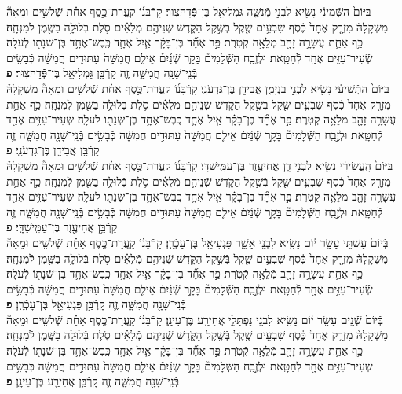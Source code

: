 \documentclass[twoside, openany, parskip=half, 11pt]{book}
\begin{document}
\begin{footnotesize}
\begin{multicols}{2}
בַּיּוֹם֙ הַשְּֿׁמִינִ֔י נָשִׂ֖יא לִבְנֵ֣י מְֿנַשֶּׁ֑ה גַּמְלִיאֵ֖ל בֶּן־פְּֿֿדָהצֽוּר׃ קָרְֿבָּנ֜וֹ קַֽעֲרַת־כֶּ֣סֶף אַחַ֗ת שְֿׁלֹשִׁ֣ים וּמֵאָה֘ מִשְׁקָלָהּ֒ מִזְרָ֤ק אֶחָד֙ כֶּ֔סֶף שִׁבְעִ֥ים שֶׁ֖קֶל בְּֿשֶׁ֣קֶל הַקֹּ֑דֶשׁ שְֿׁנֵיהֶ֣ם מְֿלֵאִ֗ים סֹ֛לֶת בְּֿלוּלָ֥ה בַשֶּׁ֖מֶן לְֿמִנְחָֽה׃ כַּ֥ף אַחַ֛ת עֲשָׂרָ֥ה זָהָ֖ב מְֿלֵאָ֥ה קְֿטֹֽרֶת׃  פַּ֣ר אֶחָ֞ד בֶּן־בָּקָ֗ר אַ֧יִל אֶחָ֛ד כֶּֽבֶשׂ־אֶחָ֥ד בֶּן־שְֿׁנָת֖וֹ לְֿעֹלָֽה׃ שְֿׂעִיר־עִזִּ֥ים אֶחָ֖ד לְֿחַטָּֽאת׃ וּלְזֶ֣בַֽח הַשְּֿׁלָמִים֘ בָּקָ֣ר שְֿׁנַ֒יִם֒ אֵילִ֤ם חֲמִשָּׁה֙ עַתּוּדִ֣ים חֲמִשָּׁ֔ה כְּֿבָשִׂ֥ים בְּֿנֵֽי־שָׁנָ֖ה חֲמִשָּׁ֑ה זֶ֛ה קָרְֿבַּ֥ן גַּמְלִיאֵ֖ל בֶּן־פְּֿֿדָהצֽוּר׃ \textbf{פ} \\
 בַּיּוֹם֙ הַתְּֿשִׁיעִ֔י נָשִׂ֖יא לִבְנֵ֣י בִנְיָמִ֑ן אֲבִידָ֖ן בֶּן־גִּדְעֹנִֽי׃ קָרְֿבָּנ֜וֹ קַֽעֲרַת־כֶּ֣סֶף אַחַ֗ת שְֿׁלֹשִׁ֣ים וּמֵאָה֘ מִשְׁקָלָהּ֒ מִזְרָ֤ק אֶחָד֙ כֶּ֔סֶף שִׁבְעִ֥ים שֶׁ֖קֶל בְּֿשֶׁ֣קֶל הַקֹּ֑דֶשׁ שְֿׁנֵיהֶ֣ם מְֿלֵאִ֗ים סֹ֛לֶת בְּֿלוּלָ֥ה בַשֶּׁ֖מֶן לְֿמִנְחָֽה׃ כַּ֥ף אַחַ֛ת עֲשָׂרָ֥ה זָהָ֖ב מְֿלֵאָ֥ה קְֿטֹֽרֶת׃ פַּ֣ר אֶחָ֞ד בֶּן־בָּקָ֗ר אַ֧יִל אֶחָ֛ד כֶּֽבֶשׂ־אֶחָ֥ד בֶּן־שְֿׁנָת֖וֹ לְֿעֹלָֽה׃ שְֿׂעִיר־עִזִּ֥ים אֶחָ֖ד לְֿחַטָּֽאת׃ וּלְזֶ֣בַֽח הַשְּֿׁלָמִים֘ בָּקָ֣ר שְֿׁנַ֒יִם֒ אֵילִ֤ם חֲמִשָּׁה֙ עַתּוּדִ֣ים חֲמִשָּׁ֔ה כְּֿבָשִׂ֥ים בְּֿנֵֽי־שָׁנָ֖ה חֲמִשָּׁ֑ה זֶ֛ה קָרְֿבַּ֥ן אֲבִידָ֖ן בֶּן־גִּדְעֹנִֽי׃ \textbf{פ} \\
בַּיּוֹם֙ הָֽעֲשִׂירִ֔י נָשִׂ֖יא לִבְנֵ֣י דָ֑ן אֲחִיעֶ֖זֶר בֶּן־עַמִּֽישַׁדָּֽי׃ קָרְֿבָּנ֜וֹ קַֽעֲרַת־כֶּ֣סֶף אַחַ֗ת שְֿׁלֹשִׁ֣ים וּמֵאָה֘ מִשְׁקָלָהּ֒ מִזְרָ֤ק אֶחָד֙ כֶּ֔סֶף שִׁבְעִ֥ים שֶׁ֖קֶל בְּֿשֶׁ֣קֶל הַקֹּ֑דֶשׁ שְֿׁנֵיהֶ֣ם מְֿלֵאִ֗ים סֹ֛לֶת בְּֿלוּלָ֥ה בַשֶּׁ֖מֶן לְֿמִנְחָֽה׃ כַּ֥ף אַחַ֛ת עֲשָׂרָ֥ה זָהָ֖ב מְֿלֵאָ֥ה קְֿטֹֽרֶת׃ פַּ֣ר אֶחָ֞ד בֶּן־בָּקָ֗ר אַ֧יִל אֶחָ֛ד כֶּֽבֶשׂ־אֶחָ֥ד בֶּן־שְֿׁנָת֖וֹ לְֿעֹלָֽה׃ שְֿׂעִיר־עִזִּ֥ים אֶחָ֖ד לְֿחַטָּֽאת׃ וּלְזֶ֣בַֽח הַשְּֿׁלָמִים֘ בָּקָ֣ר שְֿׁנַ֒יִם֒ אֵילִ֤ם חֲמִשָּׁה֙ עַתּוּדִ֣ים חֲמִשָּׁ֔ה כְּֿבָשִׂ֥ים בְּֿנֵֽי־שָׁנָ֖ה חֲמִשָּׁ֑ה זֶ֛ה קָרְֿבַּ֥ן אֲחִיעֶ֖זֶר בֶּן־עַמִּֽישַׁדָּֽי׃ \textbf{פ} \\
בְּֿיוֹם֙ עַשְׁתֵּ֣י עָשָׂ֣ר י֔וֹם נָשִׂ֖יא לִבְנֵ֣י אָשֵׁ֑ר פַּגְעִיאֵ֖ל בֶּן־עָכְֿרָֽן׃ קָרְֿבָּנ֜וֹ קַֽעֲרַת־כֶּ֣סֶף אַחַ֗ת שְֿׁלֹשִׁ֣ים וּמֵאָה֘ מִשְׁקָלָהּ֒ מִזְרָ֤ק אֶחָד֙ כֶּ֔סֶף שִׁבְעִ֥ים שֶׁ֖קֶל בְּֿשֶׁ֣קֶל הַקֹּ֑דֶשׁ שְֿׁנֵיהֶ֣ם מְֿלֵאִ֗ים סֹ֛לֶת בְּֿלוּלָ֥ה בַשֶּׁ֖מֶן לְֿמִנְחָֽה׃ כַּ֥ף אַחַ֛ת עֲשָׂרָ֥ה זָהָ֖ב מְֿלֵאָ֥ה קְֿטֹֽרֶת׃ פַּ֣ר אֶחָ֞ד בֶּן־בָּקָ֗ר אַ֧יִל אֶחָ֛ד כֶּֽבֶשׂ־אֶחָ֥ד בֶּן־שְֿׁנָת֖וֹ לְֿעֹלָֽה׃ שְֿׂעִיר־עִזִּ֥ים אֶחָ֖ד לְֿחַטָּֽאת׃ וּלְזֶ֣בַֽח הַשְּֿׁלָמִים֘ בָּקָ֣ר שְֿׁנַ֒יִם֒ אֵילִ֤ם חֲמִשָּׁה֙ עַתּוּדִ֣ים חֲמִשָּׁ֔ה כְּֿבָשִׂ֥ים בְּֿנֵֽי־שָׁנָ֖ה חֲמִשָּׁ֑ה זֶ֛ה קָרְֿבַּ֥ן פַּגְעִיאֵ֖ל בֶּן־עָכְֿרָֽן׃ \textbf{פ} \\
בְּֿיוֹם֙ שְֿׁנֵ֣ים עָשָׂ֣ר י֔וֹם נָשִׂ֖יא לִבְנֵ֣י נַפְתָּלִ֑י אֲחִירַ֖ע בֶּן־עֵינָֽן׃ קָרְֿבָּנ֜וֹ קַֽעֲרַת־כֶּ֣סֶף אַחַ֗ת שְֿׁלֹשִׁ֣ים וּמֵאָה֘ מִשְׁקָלָהּ֒ מִזְרָ֤ק אֶחָד֙ כֶּ֔סֶף שִׁבְעִ֥ים שֶׁ֖קֶל בְּֿשֶׁ֣קֶל הַקֹּ֑דֶשׁ שְֿׁנֵיהֶ֣ם מְֿלֵאִ֗ים סֹ֛לֶת בְּֿלוּלָ֥ה בַשֶּׁ֖מֶן לְֿמִנְחָֽה׃ כַּ֥ף אַחַ֛ת עֲשָׂרָ֥ה זָהָ֖ב מְֿלֵאָ֥ה קְֿטֹֽרֶת׃ פַּ֣ר אֶחָ֞ד בֶּן־בָּקָ֗ר אַ֧יִל אֶחָ֛ד כֶּֽבֶשׂ־אֶחָ֥ד בֶּן־שְֿׁנָת֖וֹ לְֿעֹלָֽה׃ שְֿׂעִיר־עִזִּ֥ים אֶחָ֖ד לְֿחַטָּֽאת׃ וּלְזֶ֣בַֽח הַשְּֿׁלָמִים֘ בָּקָ֣ר שְֿׁנַ֒יִם֒ אֵילִ֤ם חֲמִשָּׁה֙ עַתּוּדִ֣ים חֲמִשָּׁ֔ה כְּֿבָשִׂ֥ים בְּֿנֵֽי־שָׁנָ֖ה חֲמִשָּׁ֑ה זֶ֛ה קָרְֿבַּ֥ן אֲחִירַ֖ע בֶּן־עֵינָֽן׃ \textbf{פ} \\

\end{multicols}
\end{footnotesize}
\end{document}
